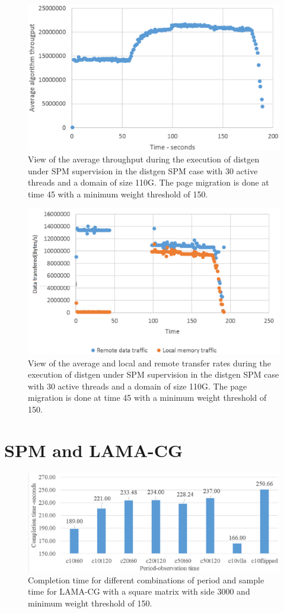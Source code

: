 \begin{figure}[th]
	\centering
		\includegraphics[width=.8\textwidth]{figures/at-thrput-random.eps}
		\caption{View of the average throughput during the execution of distgen under SPM supervision in the distgen SPM case with 30 active threads and a domain of size 110G. The page migration is done at time 45 with a minimum weight threshold of 150.}
		\label{fig:at-spmactn-thgput}
\end{figure}

\begin{figure}[th]
	\centering
		\includegraphics[width=.8\textwidth]{figures/at-transfer-random.eps}
		\caption{View of the average and local and remote transfer rates during the execution of distgen under SPM supervision in the distgen SPM case with 30 active threads and a domain of size 110G. The page migration is done at time 45 with a minimum weight threshold of 150.}
		\label{fig:at-spmactn-trsfer}
\end{figure}


\section{SPM and LAMA-CG}\label{section:spmylamacg}


\begin{figure}
	\centering
		\includegraphics[width=.7\textwidth]{figures/lam3k.eps}
		\caption{Completion time for different combinations of period and sample time for LAMA-CG with a square matrix with side 3000 and minimum weight threshold of 150.}
		\label{fig:res-lamatim-3k}
\end{figure}

